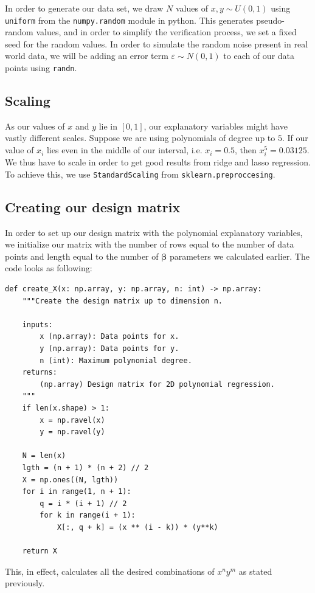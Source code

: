 \documentclass{article}
\begin{document}
In order to generate our data set, we draw $N$ values of $x,y \sim U(0, 1)$ using \verb|uniform| from the \verb|numpy.random| module in python. This generates pseudo-random values, and in order to simplify the verification process, we set a fixed seed for the random values. In order to simulate the random noise present in real world data, we will be adding an error term $\varepsilon \sim N(0,1)$ to each of our data points using \verb|randn|.

\subsection{Scaling}
As our values of $x$ and $y$ lie in $[0, 1]$, our explanatory variables might have vastly different scales. Suppose we are using polynomials of degree up to $5$. If our value of $x_i$ lies even in the middle of our interval, i.e. $x_i = 0.5$, then $x_i^5 = 0.03125$. We thus have to scale in order to get good results from ridge and lasso regression. To achieve this, we use \verb|StandardScaling| from \verb|sklearn.preproccesing|.

\subsection{Creating our design matrix}
In order to set up our design matrix with the polynomial explanatory variables, we initialize our matrix with the number of rows equal to the number of data points and length equal to the number of $\boldsymbol{\beta}$ parameters we calculated earlier. The code looks as following:
\begin{verbatim}
def create_X(x: np.array, y: np.array, n: int) -> np.array:
    """Create the design matrix up to dimension n.

    inputs:
        x (np.array): Data points for x.
        y (np.array): Data points for y.
        n (int): Maximum polynomial degree.
    returns:
        (np.array) Design matrix for 2D polynomial regression.
    """
    if len(x.shape) > 1:
        x = np.ravel(x)
        y = np.ravel(y)

    N = len(x)
    lgth = (n + 1) * (n + 2) // 2
    X = np.ones((N, lgth))
    for i in range(1, n + 1):
        q = i * (i + 1) // 2
        for k in range(i + 1):
            X[:, q + k] = (x ** (i - k)) * (y**k)

    return X
\end{verbatim}

This, in effect, calculates all the desired combinations of $x^n y^m$ as stated previously.
\end{document}

